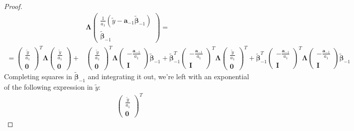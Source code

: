 \documentclass[10pt,fleqn]{amsart}
\theoremstyle{definition}
\theoremstyle{remark}
\numberwithin{equation}{section}
\newcommand{\aaa}{\boldsymbol{a}}
\newcommand{\bbeta}{\boldsymbol{\beta}}
\newcommand{\LLambda}{\boldsymbol{\Lambda}}
\newcommand{\bbetatilde}{\widetilde{\bbeta}}
\newcommand{\ytilde}{\widetilde{y}}
\begin{document}
\begin{proof}
\begin{equation*}
\begin{split}
    &\LLambda
    \left(\begin{matrix}\frac 1{a_1}\left(\ytilde-\aaa_{-1}\bbetatilde_{-1}\right)\\\bbetatilde_{-1}\end{matrix}\right)=\\
    =\left(\begin{matrix}\frac \ytilde{a_1}\\\boldsymbol{0}\end{matrix}\right)^T
    \LLambda
    \left(\begin{matrix}\frac \ytilde{a_1}\\\boldsymbol{0}\end{matrix}\right)+
    &\left(\begin{matrix}\frac \ytilde{a_1}\\\boldsymbol{0}\end{matrix}\right)^T
    \LLambda
    \left(\begin{matrix}-\frac {\aaa_{-1}}{a_1}\\\boldsymbol{I}\end{matrix}\right)\bbetatilde_{-1}+
    \bbetatilde_{-1}^T\left(\begin{matrix}-\frac {\aaa_{-1}}{a_1}\\\boldsymbol{I}\end{matrix}\right)^T
    \LLambda
    \left(\begin{matrix}\frac \ytilde{a_1}\\\boldsymbol{0}\end{matrix}\right)^T+
    \bbetatilde_{-1}^T\left(\begin{matrix}-\frac {\aaa_{-1}}{a_1}\\\boldsymbol{I}\end{matrix}\right)^T
    \LLambda\left(\begin{matrix}-\frac {\aaa_{-1}}{a_1}\\\boldsymbol{I}\end{matrix}\right)\bbetatilde_{-1}
\end{split}\end{equation*}
Completing squares in $\bbetatilde_{-1}$ and integrating it out, we're left with an exponential of the following expression in $\ytilde$:
\begin{equation}\label{appendix_gauss_conv_eq}\begin{split}
    \left(\begin{matrix}\frac \ytilde{a_1}\\\boldsymbol{0}\end{matrix}\right)^T

\end{split}
\end{equation}
\end{proof}
\end{document}
